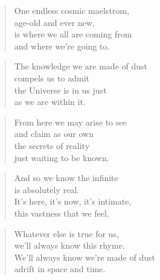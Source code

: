 \documentclass[10pt,a4paper]{article}
\begin{document}
\begin{multicols}{2}
\begin{verse}
One endless cosmic maelstrom,\\
age-old and ever new,\\
is where we all are coming from\\
and where we’re going to.
\end{verse}

\begin{verse}
The knowledge we are made of dust\\
compels us to admit\\
the Universe is in us just\\
as we are within it.
\end{verse}

\begin{verse}
From here we may arise to see\\
and claim as our own\\
the secrets of reality\\
just waiting to be known.
\end{verse}

\begin{verse}
And so we know the infinite\\
is absolutely real.\\
It’s here, it’s now, it’s intimate,\\
this vastness that we feel.
\end{verse}

\begin{verse}
Whatever else is true for us,\\
we’ll always know this rhyme.\\
We’ll always know we’re made of dust\\
adrift in space and time.
\end{verse}

\end{multicols}

\end{document}

